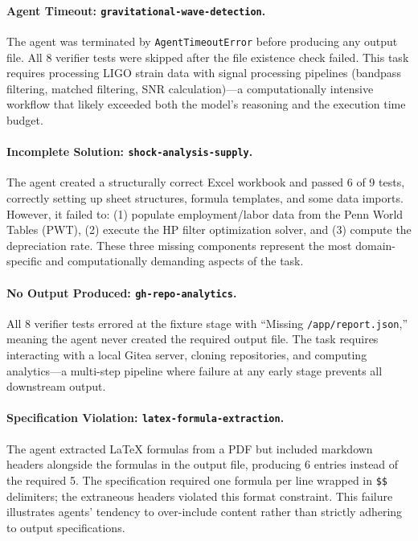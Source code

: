 \paragraph{Agent Timeout: \texttt{gravitational-wave-detection}.}
The agent was terminated by \texttt{AgentTimeoutError} before producing any output file. All 8 verifier tests were skipped after the file existence check failed. This task requires processing LIGO strain data with signal processing pipelines (bandpass filtering, matched filtering, SNR calculation)---a computationally intensive workflow that likely exceeded both the model's reasoning and the execution time budget.

\paragraph{Incomplete Solution: \texttt{shock-analysis-supply}.}
The agent created a structurally correct Excel workbook and passed 6 of 9 tests, correctly setting up sheet structures, formula templates, and some data imports. However, it failed to: (1) populate employment/labor data from the Penn World Tables (PWT), (2) execute the HP filter optimization solver, and (3) compute the depreciation rate. These three missing components represent the most domain-specific and computationally demanding aspects of the task.

\paragraph{No Output Produced: \texttt{gh-repo-analytics}.}
All 8 verifier tests errored at the fixture stage with ``Missing \texttt{/app/report.json},'' meaning the agent never created the required output file. The task requires interacting with a local Gitea server, cloning repositories, and computing analytics---a multi-step pipeline where failure at any early stage prevents all downstream output.

\paragraph{Specification Violation: \texttt{latex-formula-extraction}.}
The agent extracted LaTeX formulas from a PDF but included markdown headers alongside the formulas in the output file, producing 6 entries instead of the required 5. The specification required one formula per line wrapped in \texttt{\$\$} delimiters; the extraneous headers violated this format constraint. This failure illustrates agents' tendency to over-include content rather than strictly adhering to output specifications.

